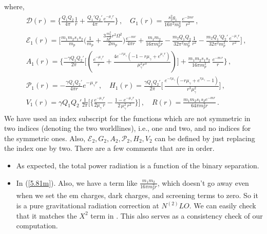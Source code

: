 where, 
\begin{align}
\begin{split}
  & \mathcal{D}(r)= \Bigg\{\frac{Q_1Q_2}{4\pi } \frac{1}{r}+\frac{Q_1'Q_2'}{4\pi} \frac{e^{-\mu_{\gamma} r}}{r}\Bigg\}\,,\quad
   G_1(r)=\frac{s_2^2g_1}{16\pi^2m_p^4}\frac{e^{-2mr}}{r^2}\,,\\& 
\mathcal{E}_1(r)=\Bigg[\frac{m_1m_2s_1s_2}{m_p}  \Big(\frac{1}{m_p}+\frac{3\frac{m_2^2}{M^2}r^2\Omega^2}{2m_p}\Big) \frac{e^{-mr}}{4\pi r}
+\frac{m_1m_2}{16\pi m_p^2 r}-\frac{m_2 Q_1Q_2}{32\pi^2m_p^2} \frac{1}{r^2}-\frac{m_2 Q_1'Q_2'}{32\pi^2m_p^2} \frac{e^{-\mu_{\gamma} r}}{r^2}\Bigg]\,,\\&
A_1(r)=\Bigg\{\frac{-\gamma Q_1Q_2'}{2\pi}\Big[  \left(\frac{  e^{-\mu_{\gamma} r}}{ r}+\frac{4e^{-r\mu_{\gamma}}\left(-1-r\mu_{\gamma}+e^{\mu_{\gamma} r}\right)}{\mu_{\gamma}^2 r^3}\right) \Big]+\frac{m_1 m_2 s_1 s_2}{16 \pi m_p^2}\,\frac{e^{-m\,r}}{r}\Bigg\}\,,\\&
\mathcal{P}_1(r)=-\frac{\gamma Q_1Q_2'}{4\pi r}e^{-\mu_{\gamma} r}\,,\quad 
H_1(r)=\frac{\gamma Q_1Q_2'}{2\pi}\Bigg[\,\frac{e^{-r \mu _{\gamma }} \left(-r \mu _{\gamma }+e^{r \mu _{\gamma }}-1\right)}{ r^3 \mu _{\gamma }^2}
\Bigg]\,,\\&
V_1(r)=\gamma Q_1Q_2'\frac{1}{2\pi} \Bigg[\Big\{\frac{  e^{-\mu_{\gamma} r}}{2 \mu_{\gamma} \,r}-\frac{1 -  e^{-\mu_{\gamma} r}}{2\, \mu_{\gamma}^2\, r^2}\Big\}\Bigg]\,,\quad 
R(r)=\frac{m_1m_2s_1s_2e^{-mr}}{64\pi m_p^2r}\,.\label{5.81m}
\end{split}
\end{align}
We have used an index subscript for the functions which are not symmetric in two indices (denoting the two worldlines), i.e., one and two, and no indices for the symmetric ones. Also, $\mathcal{E}_2,G_2,A_2,\mathcal{P}_2,H_2,V_2$ can be defined by just replacing the index one by two. There are a few comments that are in order. 

\begin{itemize}
    \item As expected, the total power radiation is a function of the binary separation.
\item In (\ref{5.81m}). Also, we have a term like $\frac{m_1m_2}{16\pi m_p^2 r}$, which doesn't go away even when we set the em charges, dark charges, and screening terms to zero. So it is a pure gravitational radiation correction at $N^{(2)}LO$. We can easily check that it matches the $X^2$ term in  \cite{Huang:2018pbu}. This also serves as a consistency check of our computation. 
\end{itemize}


